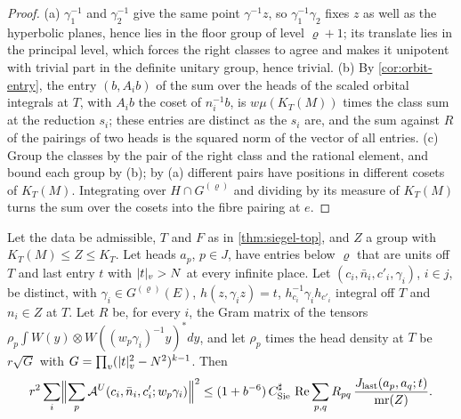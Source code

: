 \begin{proof}
(a) $\gamma_1^{-1}$ and $\gamma_2^{-1}$ give the same point $\gamma^{-1}z$, so $\gamma_1^{-1}\gamma_2$ fixes $z$ as well as the hyperbolic planes, hence lies in the floor group of level $\varrho+1$; its translate lies in the principal level,
which forces the right classes to agree and makes it unipotent with trivial part in the definite unitary group, hence trivial. (b) By \cref{cor:orbit-entry}, the entry $(b,A_ib)$ of the sum over the heads of the scaled
orbital integrals at $T$, with $A_ib$ the coset of $n_i^{-1}b$, is $w\mu(K_T(M))$ times the class sum at the reduction $s_i$; these entries are distinct as the $s_i$ are, and the sum against $R$ of the pairings of two heads is
the squared norm of the vector of all entries. (c) Group the classes by the pair of the right class and the rational element, and bound each group by (b); by (a) different pairs have positions in different cosets
of $K_T(M)$. Integrating over $H\cap G^{(\varrho)}$ and dividing by its measure of $K_T(M)$ turns the sum over the cosets into the fibre pairing at $e$.
\end{proof}

\begin{theorem}\label{thm:siegel-step}
Let the data be admissible, $T$ and $F$ as in \cref{thm:siegel-top}, and $Z$ a group with $K_T(M)\le Z\le K_T$. Let heads $a_p$, $p\in J$, have entries below $\varrho$ that are units off $T$
and last entry $t$ with $\lvert t\rvert_v>N$ at every infinite place. Let $(c_i,\bar n_i,c'_i,\gamma_i)$, $i\in j$, be distinct, with $\gamma_i\in G^{(\varrho)}(E)$, $h(z,\gamma_iz)=t$, $h_{c_i}^{-1}\gamma_ih_{c'_i}$ integral off $T$ and
$n_i\in Z$ at $T$. Let $R$ be, for every $i$, the Gram matrix of the tensors $\rho_p\int W(y)\otimes W((w_p\gamma_i)^{-1}y)^*dy$, and let $\rho_p$ times the head density at $T$ be $r\sqrt G$ with
$G=\prod_v(\lvert t\rvert_v^2-N^2)^{k-1}$. Then
\[
  r^2\sum_i\Bigl\|\sum_p\mathcal A^U(c_i,\bar n_i,c'_i;w_p\gamma_i)\Bigr\|^2\le(1+b^{-6})\,C^\sharp_{\rm Sie}\,\operatorname{Re}\sum_{p,q}R_{pq}\,\frac{J_{\rm last}(a_p,a_q;t)}{\mathrm{mr}(Z)}.
\]
\end{theorem}

